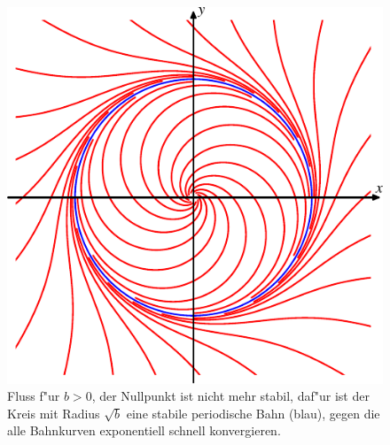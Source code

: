 \begin{figure}
\centering
\includegraphics{chapters/images/hopf-3.pdf}
\caption{Fluss f"ur $b>0$, der Nullpunkt ist nicht mehr stabil, daf"ur
ist der Kreis mit Radius $\sqrt{b}$ eine stabile periodische Bahn (blau),
gegen die alle Bahnkurven exponentiell schnell konvergieren.
\label{geometrie:hopf3}}
\end{figure}%
